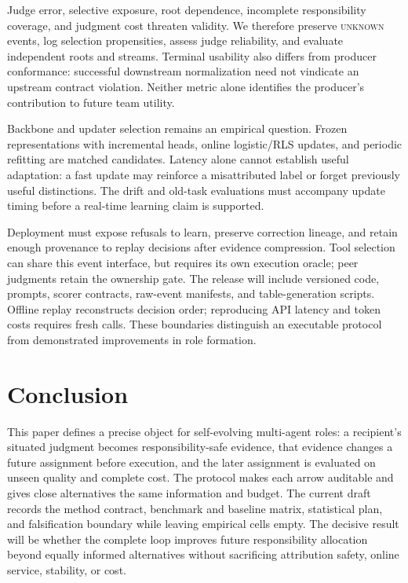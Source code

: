 \documentclass[sigconf,anonymous]{aamas}
\newcommand{\unknown}{\textsc{unknown}}
\begin{document}
Judge error, selective exposure, root dependence, incomplete responsibility coverage, and judgment cost threaten validity. We therefore preserve \unknown{} events, log selection propensities, assess judge reliability, and evaluate independent roots and streams. Terminal usability also differs from producer conformance: successful downstream normalization need not vindicate an upstream contract violation. Neither metric alone identifies the producer's contribution to future team utility.

Backbone and updater selection remains an empirical question. Frozen representations with incremental heads, online logistic/RLS updates, and periodic refitting are matched candidates. Latency alone cannot establish useful adaptation: a fast update may reinforce a misattributed label or forget previously useful distinctions. The drift and old-task evaluations must accompany update timing before a real-time learning claim is supported.

Deployment must expose refusals to learn, preserve correction lineage, and retain enough provenance to replay decisions after evidence compression. Tool selection can share this event interface, but requires its own execution oracle; peer judgments retain the ownership gate. The release will include versioned code, prompts, scorer contracts, raw-event manifests, and table-generation scripts. Offline replay reconstructs decision order; reproducing API latency and token costs requires fresh calls. These boundaries distinguish an executable protocol from demonstrated improvements in role formation.

\section{Conclusion}

This paper defines a precise object for self-evolving multi-agent roles: a recipient's situated judgment becomes responsibility-safe evidence, that evidence changes a future assignment before execution, and the later assignment is evaluated on unseen quality and complete cost. The protocol makes each arrow auditable and gives close alternatives the same information and budget. The current draft records the method contract, benchmark and baseline matrix, statistical plan, and falsification boundary while leaving empirical cells empty. The decisive result will be whether the complete loop improves future responsibility allocation beyond equally informed alternatives without sacrificing attribution safety, online service, stability, or cost.

\clearpage


\end{document}
